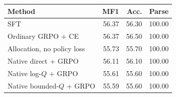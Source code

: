 \begin{tabular}{lrrr}
\toprule
Method & MF1 & Acc. & Parse \\
\midrule
SFT & 56.37 & 56.30 & 100.00 \\
Ordinary GRPO + CE & 56.37 & 56.50 & 100.00 \\
Allocation, no policy loss & 55.73 & 55.70 & 100.00 \\
Native direct + GRPO & 56.11 & 56.10 & 100.00 \\
Native log-$Q$ + GRPO & 55.61 & 55.60 & 100.00 \\
Native bounded-$Q$ + GRPO & 55.59 & 55.60 & 100.00 \\
\bottomrule
\end{tabular}
